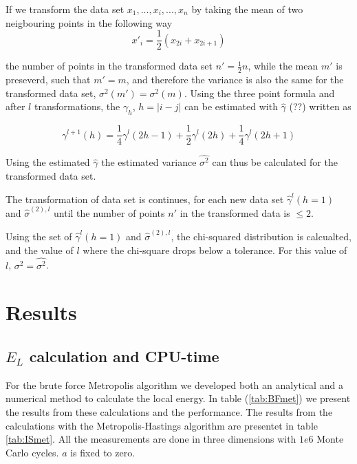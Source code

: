\documentclass[norsk,a4paper,12pt]{article}
\begin{document}
If we transform the data set ${x_1, ...,x_i,..., x_n}$ by taking the mean of two neigbouring points in the following way
\begin{equation}
	x'_i = \frac{1}{2}(x_{2i} + x_{2i+1})
\end{equation}

 the number of points in the transformed data set $n' = \frac{1}{2} n$, while the mean $m'$ is preseverd, such that $m' = m$, and therefore the variance is also the same for the transformed data set, $\sigma^2(m') = \sigma^2(m)$. Using the three point formula and after $l$ transformations, the $\gamma_h$, $h= |i-j|$ can be estimated with $\hat{\gamma}$ (??) written as 
 
 \begin{equation}
 	\gamma^{l+1}(h) = \frac{1}{4} \gamma^{l}(2h-1) + \frac{1}{2}\gamma^{l}(2h) + \frac{1}{4} \gamma^{l}(2h+1) 
 \end{equation}

Using the estimated  $\hat{\gamma}$ the estimated variance $ \hat{\sigma^2}$ can thus be calculated for the transformed data set.

 The transformation of data set  is continues, for each new data set $\hat{\gamma}^l(h=1)$ and $\hat{\sigma}^{(2),l}$ until the number of points $n'$ in the transformed data is $\leq 2$. 
 
 Using the set of $\hat{\gamma}^l(h=1)$ and $\hat{\sigma}^{(2),l}$, the chi-squared distribution is calcualted, and the value of $l$ where the chi-square drops below a tolerance. For this value of $l$, $\sigma^2 = \hat{\sigma^2}$.


\section{Results}

\subsection{$E_L$ calculation and CPU-time}\label{CPU}
For the brute force Metropolis algorithm we developed both an analytical and a numerical method to calculate the local energy. In table (\ref{tab:BFmet}) we present the results from these calculations and the performance. The results from the calculations with the Metropolis-Hastings algorithm are presentet in table \ref{tab:ISmet}. All the measurements are done in three dimensions with $1e6$ Monte Carlo cycles. $a$ is fixed to zero.
\end{document}
